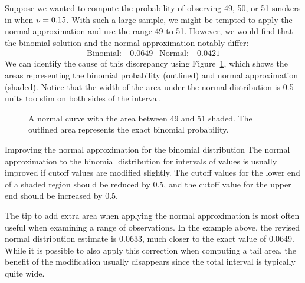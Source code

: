 \newcommand{\smokeA}{49}
\newcommand{\smokeB}{50}
\newcommand{\smokeC}{51}
\newcommand{\smokeABCBinom}{0.0649}
\newcommand{\smokeABCNormal}{0.0421}
\newcommand{\smokeABCNormalFixed}{0.0633}

Suppose we wanted to compute the probability of observing
\smokeA{}, \smokeB{}, or \smokeC{} smokers in \smoken{}
when $p = 0.15{}$.
With such a large sample, we might be tempted to apply
the normal approximation and use the range \smokeA{} to \smokeC{}.
However, we would find that the binomial solution and the normal
approximation notably differ:
\begin{align*}
\text{Binomial:}&\ \smokeABCBinom{}
&\text{Normal:}&\ \smokeABCNormal{}
\end{align*}
We can identify the cause of this discrepancy using
Figure~\ref{normApproxToBinomFail}, which shows the areas
representing the binomial probability (outlined) and normal
approximation (shaded).
Notice that the width of the area under the normal
distribution is 0.5 units too slim on both sides of
the interval.

\begin{figure}[h]
  \centering
  \caption{A normal curve with the area between
      \smokeA{} and \smokeC{} shaded.
      The outlined area represents the exact binomial
      probability.}
  \label{normApproxToBinomFail}
\end{figure}

\begin{onebox}{Improving the normal approximation
    for the binomial distribution}
  The normal approximation to the binomial distribution
  for intervals of values is usually improved if cutoff
  values are modified slightly.
  The cutoff values for the lower end of a shaded region
  should be reduced by 0.5, and the cutoff value for the
  upper end should be increased by 0.5.
\end{onebox}

The tip to add extra area when applying the normal
approximation is most often useful when examining
a range of observations.
In the example above, the revised normal distribution
estimate is \smokeABCNormalFixed{}, much closer to the
exact value of \smokeABCBinom{}.
While it is possible to also apply this correction when
computing a tail area, the benefit of the modification
usually disappears since the total interval is typically
quite wide.



